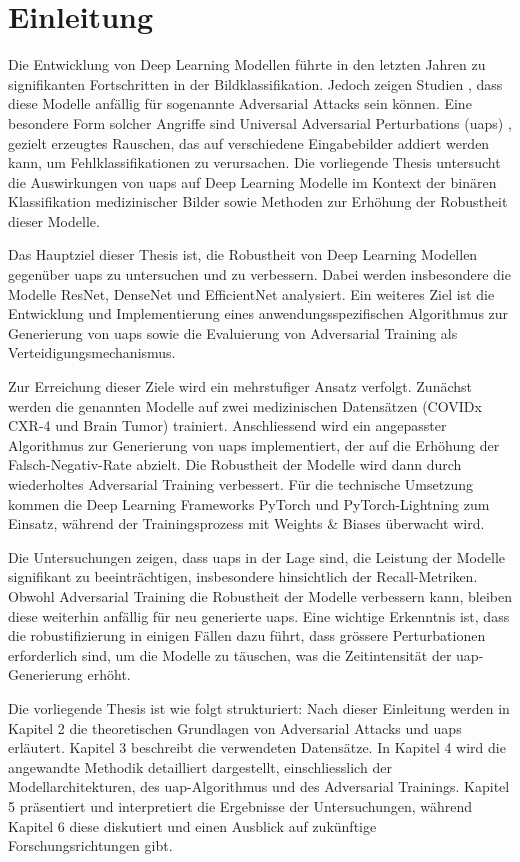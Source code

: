 \section{Einleitung}
Die Entwicklung von Deep Learning Modellen führte in den letzten Jahren zu signifikanten Fortschritten in der Bildklassifikation. Jedoch zeigen Studien \cite{szegedy_intriguing_2014}\cite{goodfellow_explaining_2015}, dass diese Modelle anfällig für sogenannte Adversarial Attacks sein können. Eine besondere Form solcher Angriffe sind Universal Adversarial Perturbations (\acrshort{uap}s) \cite{moosavi-dezfooli_universal_2017}, gezielt erzeugtes Rauschen, das auf verschiedene Eingabebilder addiert werden kann, um Fehlklassifikationen zu verursachen. Die vorliegende Thesis untersucht die Auswirkungen von \acrshort{uap}s auf Deep Learning Modelle im Kontext der binären Klassifikation medizinischer Bilder sowie Methoden zur Erhöhung der Robustheit dieser Modelle.

Das Hauptziel dieser Thesis ist, die Robustheit von Deep Learning Modellen gegenüber \acrshort{uap}s zu untersuchen und zu verbessern. Dabei werden insbesondere die Modelle ResNet, DenseNet und EfficientNet analysiert. Ein weiteres Ziel ist die Entwicklung und Implementierung eines anwendungsspezifischen Algorithmus zur Generierung von \acrshort{uap}s sowie die Evaluierung von Adversarial Training als Verteidigungsmechanismus.

Zur Erreichung dieser Ziele wird ein mehrstufiger Ansatz verfolgt. Zunächst werden die genannten Modelle auf zwei medizinischen Datensätzen (COVIDx CXR-4 und Brain Tumor) trainiert. Anschliessend wird ein angepasster Algorithmus zur Generierung von \acrshort{uap}s implementiert, der auf die Erhöhung der Falsch-Negativ-Rate abzielt. Die Robustheit der Modelle wird dann durch wiederholtes Adversarial Training verbessert. Für die technische Umsetzung kommen die Deep Learning Frameworks PyTorch und PyTorch-Lightning zum Einsatz, während der Trainingsprozess mit Weights \& Biases überwacht wird.

Die Untersuchungen zeigen, dass \acrshort{uap}s in der Lage sind, die Leistung der Modelle signifikant zu beeinträchtigen, insbesondere hinsichtlich der Recall-Metriken. Obwohl Adversarial Training die Robustheit der Modelle verbessern kann, bleiben diese weiterhin anfällig für neu generierte \acrshort{uap}s. Eine wichtige Erkenntnis ist, dass die \Gls{robustifizierung} in einigen Fällen dazu führt, dass grössere Perturbationen erforderlich sind, um die Modelle zu täuschen, was die Zeitintensität der \acrshort{uap}-Generierung erhöht.

Die vorliegende Thesis ist wie folgt strukturiert: Nach dieser Einleitung werden in Kapitel 2 die theoretischen Grundlagen von Adversarial Attacks und \acrshort{uap}s erläutert. Kapitel 3 beschreibt die verwendeten Datensätze. In Kapitel 4 wird die angewandte Methodik detailliert dargestellt, einschliesslich der Modellarchitekturen, des \acrshort{uap}-Algorithmus und des Adversarial Trainings. Kapitel 5 präsentiert und interpretiert die Ergebnisse der Untersuchungen, während Kapitel 6 diese diskutiert und einen Ausblick auf zukünftige Forschungsrichtungen gibt.
